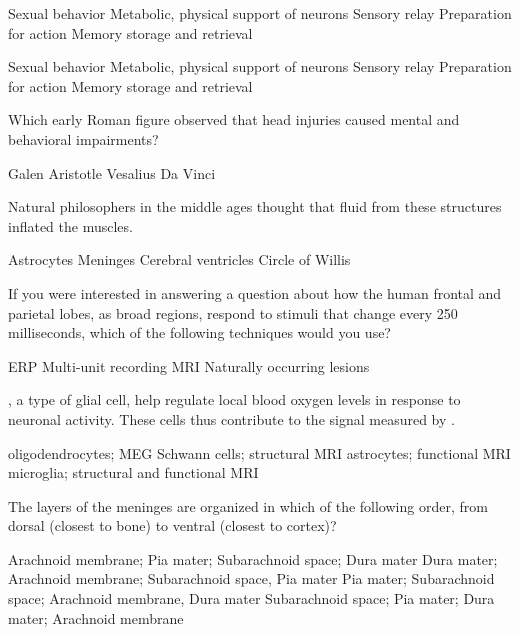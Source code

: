 \documentclass[answers]{exam}
\begin{document}
\begin{questions}
\newpage

\begin{choices}
\choice Sexual behavior
\choice Metabolic, physical support of neurons
\choice Sensory relay
\choice Preparation for action
\correctchoice Memory storage and retrieval
\end{choices}

\begin{choices}
\choice Sexual behavior
\choice Metabolic, physical support of neurons
\choice Sensory relay
\correctchoice Preparation for action
\choice Memory storage and retrieval
\end{choices}

\question Which early Roman figure observed that head injuries caused mental and behavioral impairments?
\begin{choices}
\correctchoice Galen
\choice Aristotle 
\choice Vesalius 
\choice Da Vinci
\end{choices}

\question Natural philosophers in the middle ages thought that fluid from these structures inflated the muscles.
\begin{choices}
\choice Astrocytes
\choice Meninges
\correctchoice Cerebral ventricles
\choice Circle of Willis
\end{choices}

\question If you were interested in answering a question about how the human frontal and parietal lobes, as broad regions, respond to stimuli that change every 250 milliseconds, which of the following techniques would you use?
\begin{choices}
\correctchoice ERP
\choice Multi-unit recording 
\choice MRI
\choice Naturally occurring lesions
\end{choices}


\question \fillin, a type of glial cell, help regulate local blood oxygen levels in response to neuronal activity. These cells thus contribute to the signal measured by \fillin.
\begin{choices}
\choice oligodendrocytes; MEG
\choice Schwann cells; structural MRI
\correctchoice astrocytes; functional MRI
\choice microglia; structural and functional MRI
\end{choices}

\newpage

\question The layers of the meninges are organized in which of the following order, from dorsal (closest to bone) to ventral (closest to cortex)?
\begin{choices}
\choice Arachnoid membrane; Pia mater; Subarachnoid space; Dura mater
\correctchoice Dura mater; Arachnoid membrane; Subarachnoid space, Pia mater
\choice Pia mater; Subarachnoid space; Arachnoid membrane, Dura mater
\choice Subarachnoid space; Pia mater; Dura mater; Arachnoid membrane 
\end{choices}


\end{questions}
\end{document}
